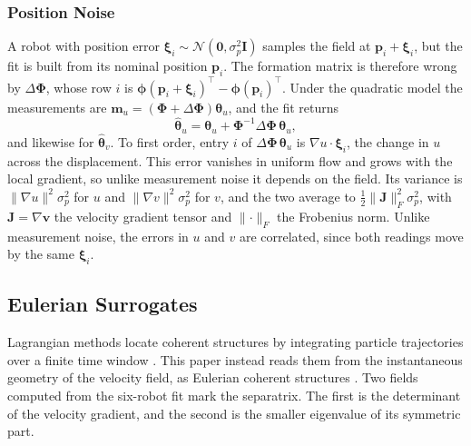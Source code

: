 \documentclass[lettersize,journal]{IEEEtran}
\begin{document}
\subsubsection{Position Noise}
A robot with position error
$\boldsymbol{\xi}_i \sim \mathcal{N}(\mathbf{0}, \sigma_p^2\mathbf{I})$
samples the field at $\mathbf{p}_i + \boldsymbol{\xi}_i$, but the fit is
built from its nominal position $\mathbf{p}_i$. The formation matrix is
therefore wrong by $\Delta\boldsymbol{\Phi}$, whose row $i$ is
$\boldsymbol{\phi}(\mathbf{p}_i + \boldsymbol{\xi}_i)^{\top} -
\boldsymbol{\phi}(\mathbf{p}_i)^{\top}$. Under the quadratic model the
measurements are
$\mathbf{m}_u = (\boldsymbol{\Phi} + \Delta\boldsymbol{\Phi})
\boldsymbol{\theta}_u$, and the fit returns
\begin{equation}
    \hat{\boldsymbol{\theta}}_u = \boldsymbol{\theta}_u
        + \boldsymbol{\Phi}^{-1}\Delta\boldsymbol{\Phi}\,
          \boldsymbol{\theta}_u ,
    \label{eq:pos_noise}
\end{equation}
and likewise for $\hat{\boldsymbol{\theta}}_v$. To first order, entry
$i$ of $\Delta\boldsymbol{\Phi}\,\boldsymbol{\theta}_u$ is
$\nabla u \cdot \boldsymbol{\xi}_i$, the change in $u$ across the
displacement. This error vanishes in uniform flow and grows with the
local gradient, so unlike measurement noise it depends on the field.
Its variance is $\lVert\nabla u\rVert^2\sigma_p^2$ for $u$ and
$\lVert\nabla v\rVert^2\sigma_p^2$ for $v$, and the two average to
$\tfrac{1}{2}\lVert\mathbf{J}\rVert_F^2\sigma_p^2$, with $\mathbf{J} = \nabla\mathbf{v}$ the velocity gradient tensor and $\lVert\cdot\rVert_F$ the Frobenius norm. Unlike measurement noise, the errors in $u$ and $v$ are
correlated, since both readings move by the same $\boldsymbol{\xi}_i$.



\subsection{Eulerian Surrogates}
\label{sec:surrogates}

Lagrangian methods locate coherent structures by integrating particle
trajectories over a finite time window \cite{16,17}. This paper instead
reads them from the instantaneous geometry of the velocity field, as
Eulerian coherent structures \cite{19}. Two fields computed from the
six-robot fit mark the separatrix. The first is the determinant of the velocity
gradient, and the second is the smaller eigenvalue of its symmetric
part.
\end{document}

